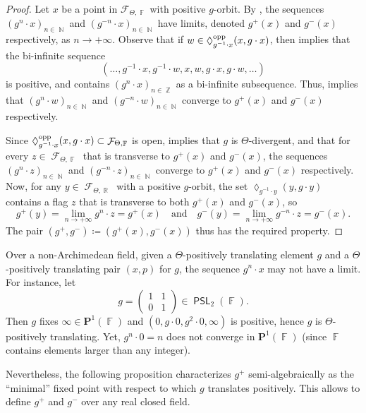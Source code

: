 \documentclass{amsart}
\theoremstyle{plain}
\theoremstyle{definition}
\DeclareMathOperator{\PSL}{\mathsf{PSL}}
\DeclareMathOperator{\Diam}{\lozenge}
\DeclareMathOperator{\Fc}{\mathcal{F}}
\DeclareMathOperator{\Fb}{{\mathbb{F}}}
\DeclareMathOperator{\Nb}{{\mathbb{N}}}
\DeclareMathOperator{\Rb}{{\mathbb{R}}}
\DeclareMathOperator{\Zb}{\mathbb{Z}}
\newcommand{\1}{\mathbf{1}}
\begin{document}
\begin{proof}
    Let $x$ be a point in $\mathcal F_{\Theta,\Fb}$ with positive $g$-orbit. By , the sequences $(g^n\cdot x)_{n\in \Nb}$ and $(g^{-n}\cdot x)_{n\in \Nb}$ have limits, denoted $g^+(x)$ and $g^-(x)$ respectively, as $n\to +\infty$. Observe that if $w\in\Diam_{g^{-1}\cdot x}^{\rm opp}(x,g\cdot x)$, then  implies that the bi-infinite sequence
    \[(\dots,g^{-1}\cdot x,g^{-1}\cdot w,x,w,g\cdot x,g\cdot w,\dots)\]
    is positive, and contains $(g^n\cdot x)_{n\in\Zb}$ as a bi-infinite subsequence. Thus,  implies that $(g^n\cdot w)_{n\in\Nb}$ and $(g^{-n}\cdot w)_{n\in\Nb}$ converge to $g^+(x)$ and $g^-(x)$ respectively. 
    
    Since $\Diam^{\rm opp}_{g^{-1}\cdot x}(x,g\cdot x)\subset\Fc_{\Theta,\Fb}$ is open,  implies that $g$ is $\Theta$-divergent, and that for every $z\in\Fc_{\Theta,\Fb}$ that is transverse to $g^+(x)$ and $g^-(x)$, the sequences $(g^n\cdot z)_{n\in\Nb}$ and $(g^{-n}\cdot z)_{n\in\Nb}$ converge to $g^+(x)$ and $g^-(x)$ respectively. Now, for any $y\in \Fc_{\Theta,\Rb}$ with a positive $g$-orbit, the set $\Diam_{g^{-1}\cdot y}(y,g\cdot y)$ contains a flag $z$ that is transverse to both $g^+(x)$ and $g^-(x)$, so
    \[g^+(y)=\lim_{n\to+\infty}g^n\cdot z=g^+(x)\quad\text{and}\quad g^-(y)=\lim_{n\to+\infty}g^{-n}\cdot z=g^-(x).\]
    The pair $(g^+,g^-)\coloneqq(g^+(x),g^-(x))$ thus has the required property.
\end{proof}

Over a non-Archimedean field, given a $\Theta$-positively translating element $g$ and a $\Theta$-positively translating pair $(x,p)$ for $g$, the sequence $g^n\cdot x$ may not have a limit.
For instance, let 
\[g= \left( \begin{matrix} 1 & 1 \\ 0 & 1\end{matrix}\right) \in \PSL_2(\Fb).\]
Then $g$ fixes $\infty \in \mathbf{P}^1(\Fb)$ and $(0, g\cdot 0, g^2 \cdot 0, \infty)$ is positive, hence $g$ is $\Theta$-positively translating.
Yet, $g^n\cdot 0 = n$ does not converge in $\mathbf{P}^1(\Fb) $ (since $\Fb$ contains elements larger than any integer).

Nevertheless, the following proposition characterizes $g^+$ semi-algebraically as the ``minimal'' fixed point with respect to which $g$ translates positively. This allows to define $g^+$ and $g^-$ over any real closed field.
\end{document}
